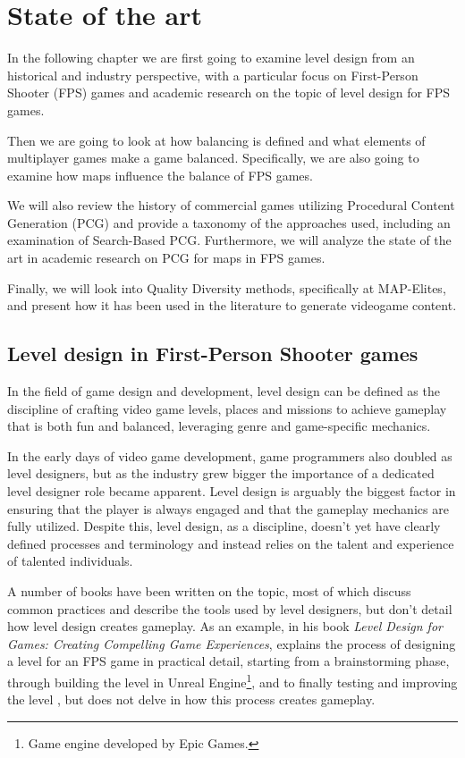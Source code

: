 \chapter{State of the art}
\label{ch:state_of_the_art}
In the following chapter we are first going to examine level design from an historical and industry perspective, with a particular focus on First-Person Shooter (FPS) games and academic research on the topic of level design for FPS games.

Then we are going to look at how balancing is defined and what elements of multiplayer games make a game balanced. Specifically, we are also going to examine how maps influence the balance of FPS games.

We will also review the history of commercial games utilizing Procedural Content Generation (PCG) and provide a taxonomy of the approaches used, including an examination of Search-Based PCG. Furthermore, we will analyze the state of the art in academic research on PCG for maps in FPS games.

Finally, we will look into Quality Diversity methods, specifically at MAP-Elites, and present how it has been used in the literature to generate videogame content.

\section{Level design in First-Person Shooter games}
\label{sec:level_design}
In the field of game design and development, level design can be defined as the discipline of crafting video game levels, places and missions to achieve gameplay that is both fun and balanced, leveraging genre and game-specific mechanics.

In the early days of video game development, game programmers also doubled as level designers, but as the industry grew bigger the importance of a dedicated level designer role became apparent. Level design is arguably the biggest factor in ensuring that the player is always engaged and that the gameplay mechanics are fully utilized. Despite this, level design, as a discipline, doesn't yet have clearly defined processes and terminology and instead relies on the talent and experience of talented individuals.

A number of books have been written on the topic, most of which discuss common practices and describe the tools used by level designers, but don't detail how level design creates gameplay. As an example, in his book \textit{Level Design for Games: Creating Compelling Game Experiences},  explains the process of designing a level for an FPS game in practical detail, starting from a brainstorming phase, through building the level in Unreal Engine\footnote{Game engine developed by Epic Games.}, and to finally testing and improving the level \cite{co_level_2006}, but does not delve in how this process creates gameplay. \cite{hullett_design_2010}

